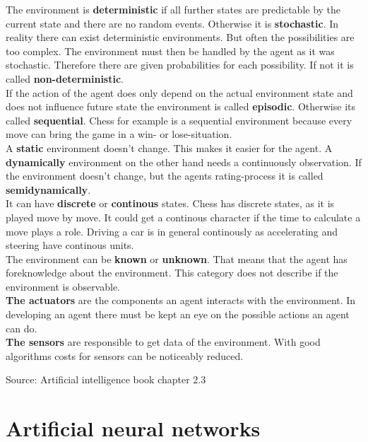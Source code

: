 \documentclass[10pt,a4paper,DIV=11]{scrreprt}
\begin{document}
The environment is \textbf{deterministic} if all further states are predictable by the current state and there are no random events. Otherwise it is \textbf{stochastic}. In reality there can exist deterministic environments. But often the possibilities are too complex. The environment must then be handled by the agent as it was stochastic. Therefore there are given probabilities for each possibility. If not it is called \textbf{non-deterministic}. \\

If the action of the agent does only depend on the actual environment state and does not influence future state the environment is called \textbf{episodic}. Otherwise its called
\textbf{sequential}. Chess for example is a sequential environment because every move can bring the game in a win- or lose-situation. \\

A \textbf{static} environment doesn't change. This makes it easier for the agent. A \textbf{dynamically} environment on the other hand needs a continuously observation. If the environment doesn't change, but the agents rating-process it is called \textbf{semidynamically}. \\

It can have \textbf{discrete} or \textbf{continous} states. Chess has discrete states, as it is played move by move. It could get a continous character if the time to calculate a move plays a role. Driving a car is in general continously as accelerating and steering have continous units.\\

The environment can be \textbf{known} or \textbf{unknown}. That means that the agent has foreknowledge about the environment. This category does not describe if the environment is observable. \\


\textbf{The actuators} are the components an agent interacts with the environment. In developing an agent there must be kept an eye on the possible actions an agent can do.\\

\textbf{The sensors} are responsible to get data of the environment. With good algorithms costs for sensors can be noticeably reduced.


Source: Artificial intelligence book chapter 2.3

\chapter{Artificial neural networks}
\end{document}
